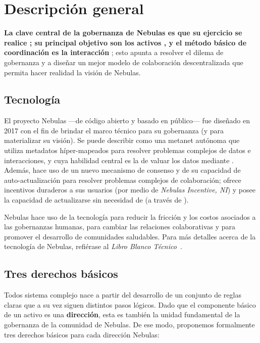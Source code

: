 \section{Descripción general}

\textbf{La clave central de la gobernanza de Nebulas es que su ejercicio se realice \onchain; su principal objetivo son los activos \onchain, y el método básico de coordinación es la interacción \onchain}; esto apunta a resolver el dilema de gobernanza y a diseñar un mejor modelo de colaboración descentralizada que permita hacer realidad la visión de Nebulas.

\subsection{Tecnología}

El proyecto Nebulas —de código abierto y basado en \blockchain público— fue diseñado en 2017 con el fin de brindar el marco técnico para su gobernanza (y para materializar su visión). Se puede describir como una metanet autónoma que utiliza metadatos híper-mapeados para resolver problemas complejos de datos e interacciones, y cuya habilidad central es la de valuar los datos \onchain mediante \nr. Además, hace uso de un nuevo mecanismo de consenso y de su capacidad de auto-actualización para resolver problemas complejos de colaboración; ofrece incentivos duraderos a sus usuarios (por medio de \textit{Nebulas Incentive, NI}) y posee la capacidad de actualizarse sin necesidad de \forks (a través de \nforce).

Nebulas hace uso de la tecnología para reducir la fricción y los costos asociados a las gobernanzas humanas, para cambiar las relaciones colaborativas y para promover el desarrollo de comunidades saludables. Para más detalles acerca de la tecnología de Nebulas, refiérase al \textit{Libro Blanco Técnico}~\cite{TechWhitepaper}.

\subsection{Tres derechos básicos}
\label{rights}

Todos sistema complejo nace a partir del desarrollo de un conjunto de reglas claras que a su vez siguen distintos pasos lógicos. Dado que el componente básico de un activo \blockchain es una \textbf{dirección}, esta es también la unidad fundamental de la gobernanza de la comunidad de Nebulas. De ese modo, proponemos formalmente tres derechos básicos para cada dirección Nebulas:


